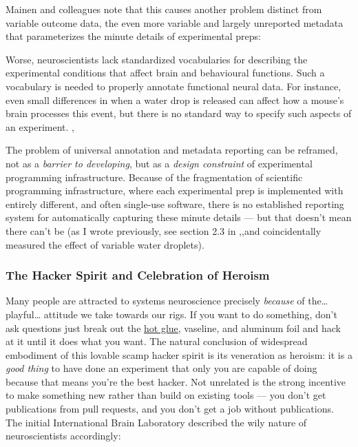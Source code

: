 \documentclass[nohyper]{tufte-book-jls}
\begin{document}
Mainen and colleagues note that this causes another problem distinct
from variable outcome data, the even more variable and largely
unreported metadata that parameterizes the minute details of
experimental preps:

\begin{leftbar}
Worse, neuroscientists lack standardized vocabularies for describing the
experimental conditions that affect brain and behavioural functions.
Such a vocabulary is needed to properly annotate functional neural data.
For instance, even small differences in when a water drop is released
can affect how a mouse's brain processes this event, but there is no
standard way to specify such aspects of an experiment. \cite{mainenBetterWayCrack2016},\end{leftbar}
The problem of universal annotation and metadata reporting can be
reframed, not as a \emph{barrier to developing}, but as a \emph{design
constraint} of experimental programming infrastructure. Because of the
fragmentation of scientific programming infrastructure, where each
experimental prep is implemented with entirely different, and often
single-use software, there is no established reporting system for
automatically capturing these minute details --- but that doesn't mean
there can't be (as I wrote previously, see section 2.3 in \cite{saundersAutopilotAutomatingBehavioral2019},,and coincidentally
measured the effect of variable water droplets).

\hypertarget{the-hacker-spirit-and-celebration-of-heroism}{%
\subsubsection{The Hacker Spirit and Celebration of
Heroism}\label{the-hacker-spirit-and-celebration-of-heroism}}

Many people are attracted to systems neuroscience precisely
\emph{because} of the\ldots{} playful\ldots{} attitude we take towards
our rigs. If you want to do something, don't ask questions just break
out the \href{http://jvoigts.scripts.mit.edu/blog/review-hot-glue/}{hot
glue}, vaseline, and aluminum foil and hack at it until it does what you
want. The natural conclusion of widespread embodiment of this lovable
scamp hacker spirit is its veneration as heroism: it is a \emph{good
thing} to have done an experiment that only you are capable of doing
because that means you're the best hacker. Not unrelated is the strong
incentive to make something new rather than build on existing tools ---
you don't get publications from pull requests, and you don't get a job
without publications. The initial International Brain Laboratory
described the wily nature of neuroscientists accordingly:
\end{document}
